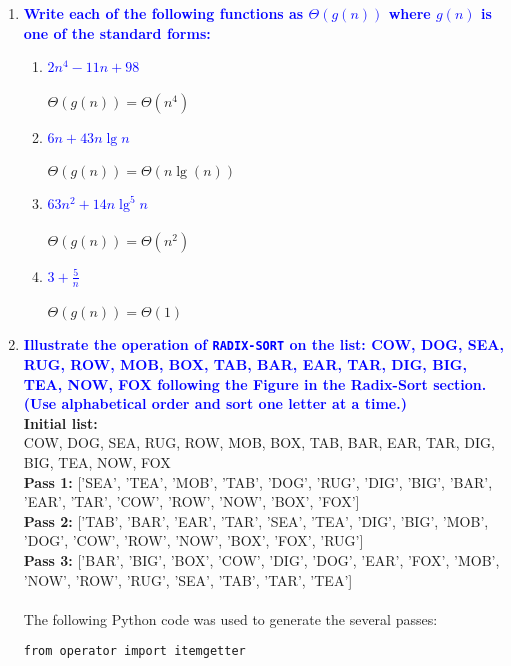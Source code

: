 \documentclass{article}
\begin{document}
\begin{enumerate}
\item \textbf{\textcolor{blue}{Write each of the following functions as $\Theta(g(n))$ where $g(n)$ is one of the standard forms:}}
    \begin{enumerate}
    \item \textbf{\textcolor{blue}{$2n^4-11n+98$}}
        \\\\ $\Theta(g(n)) = \Theta(n^4)$ \\
    \item \textbf{\textcolor{blue}{$6n + 43n\lg n$}}
        \\\\ $\Theta(g(n)) = \Theta(n\lg(n))$ \\
    \item \textbf{\textcolor{blue}{$63n^2 + 14n\lg^5n$}}
        \\\\ $\Theta(g(n)) = \Theta(n^2)$ \\
    \item \textbf{\textcolor{blue}{$3 + \frac{5}{n}$}}
        \\\\ $\Theta(g(n)) = \Theta(1)$ \\
    \end{enumerate}

\item \textbf{\textcolor{blue}{Illustrate the operation of {\tt RADIX-SORT} on the list: COW, DOG, SEA, RUG, ROW, MOB, BOX, TAB, BAR, EAR, TAR, DIG, BIG, TEA, NOW, FOX following the Figure in the Radix-Sort section. (Use alphabetical order and sort one letter at a time.)}} 
    \\ \textbf{Initial list:}
    \\ COW, DOG, SEA, RUG, ROW, MOB, BOX, TAB, BAR, EAR, TAR, DIG, BIG, TEA, NOW, FOX
    \\ \textbf{Pass 1:} ['SEA', 'TEA', 'MOB', 'TAB', 'DOG', 'RUG', 'DIG', 'BIG', 'BAR', 'EAR', 'TAR', 'COW', 'ROW', 'NOW', 'BOX', 'FOX']
    \\ \textbf{Pass 2:} ['TAB', 'BAR', 'EAR', 'TAR', 'SEA', 'TEA', 'DIG', 'BIG', 'MOB', 'DOG', 'COW', 'ROW', 'NOW', 'BOX', 'FOX', 'RUG']
    \\ \textbf{Pass 3:} ['BAR', 'BIG', 'BOX', 'COW', 'DIG', 'DOG', 'EAR', 'FOX', 'MOB', 'NOW', 'ROW', 'RUG', 'SEA', 'TAB', 'TAR', 'TEA']
    \\\\ The following Python code was used to generate the several passes:
    \begin{verbatim}
from operator import itemgetter
             

\end{verbatim}
\end{enumerate}
\end{document}
